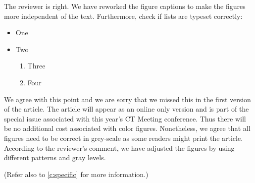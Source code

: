 \documentclass[american,version=last,fromphone,fromemail,svgnames,dvipsnames,x11names]{scrlttr2}
\begin{document}
\begin{rebuttal}
  \begin{comment}
  \label{c:specific}
  You need to include figure captions that make your figures intelligible.
  See~\cref{a:foo} and \cref{c:foo2}.
  \end{comment}

  \begin{answer}
    The reviewer is right. We have reworked the figure captions to make the
    figures more independent of the text. Furthermore, check if lists are
    typeset correctly:
    \begin{itemize}
      \item One
      \item Two
        \begin{enumerate}
          \item Three
          \item Four
        \end{enumerate}
    \end{itemize}
  \end{answer}

  \begin{comment}
    \label{c:c2}
    Are you going to pay for color in the print article? If not, the lines are
    not intelligible in Figures 2, 5, 11. In addition to color coding for the
    digital version, you could make lines with distinct patterns (dots, dashes,
    etc.) so they are distinct in monochrome presentations.
  \end{comment}

  \begin{answer}
    We agree with this point and we are sorry that we missed this in the first
    version of the article. The article will appear as an online only version
    and is part of the special issue associated with this year’s CT Meeting
    conference. Thus there will be no additional cost associated with color
    figures. Nonetheless, we agree that all figures need to be correct in
    grey-scale as some readers might print the article. According to the
    reviewer’s comment, we have adjusted the figures by using different patterns
    and gray levels.

    (Refer also to \cref{c:specific} for more information.)
  \end{answer}
\end{rebuttal}

\lipsum[1] \addition[label=a:foo,ref=c:specific]{\lipsum[2]} \lipsum[3]
\end{document}
